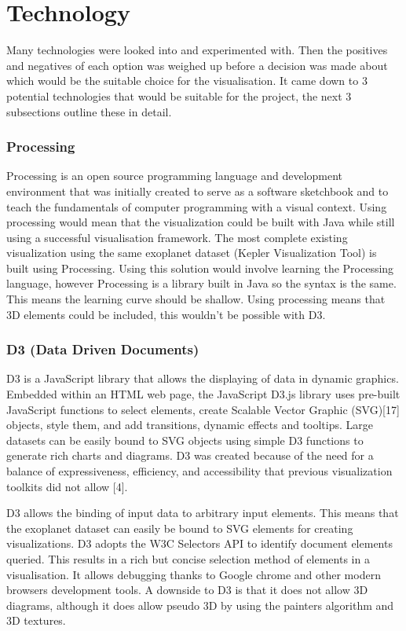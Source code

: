 \chapter{Technology} 

Many technologies were looked into and experimented with. Then the positives and
negatives of each option was weighed up before a decision was made about which would be the
suitable choice for the visualisation. It came down to 3 potential technologies that
would be suitable for the project, the next 3 subsections outline these in
detail.

\subsection{Processing}
Processing is an open source programming language and development environment
that was initially created to serve as a software
sketchbook and to teach the fundamentals of computer programming with a visual
context.
Using processing would mean that the visualization could be built with Java
while still using
a successful visualisation framework. The most complete existing visualization
using
the same exoplanet dataset (Kepler Visualization Tool) is built using
Processing.
Using this solution would involve learning the Processing language, however
Processing
is a library built in Java so the syntax is the same. This means the learning
curve should be shallow.
Using processing means that 3D elements could be included, this wouldn't be
possible with D3.

\subsection{D3 (Data Driven Documents)}
D3 is a JavaScript library that allows the displaying of data in dynamic
graphics. Embedded
within an HTML web page, the JavaScript D3.js library uses pre-built JavaScript
functions to
select elements, create Scalable Vector Graphic (SVG)[17] objects, style them,
and add transitions,
dynamic effects and tooltips. Large datasets can be easily bound to SVG objects
using
simple D3 functions to generate rich charts and diagrams. D3 was created because
of the
need for a balance of expressiveness, efficiency, and accessibility that
previous visualization
toolkits did not allow [4].

D3 allows the binding of input data to arbitrary input elements. This means that
the exoplanet dataset can easily be bound to SVG elements for creating visualizations. D3
adopts the W3C Selectors API to identify document elements queried. This results in a
rich but concise selection method of elements in a visualisation. It allows debugging thanks to Google chrome and other modern browsers
development tools. A downside to D3 is that it does not allow 3D diagrams, although it does
allow pseudo 3D by using the painters algorithm and 3D textures.

